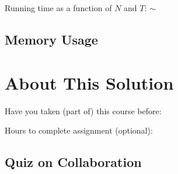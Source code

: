 \documentclass[11pt,a4paper,notitlepage]{article}
\newcommand{\explanation}[1]{}  %
\begin{document}
Running time as a function of $N$ and $T$:  $\sim$ 

\explanation{Explain briefly how you come up this running time}


\subsection{Memory Usage}
\explanation{
How much memory (in bytes) does a \texttt{Percolation} object use to store
an $N$-by-$N$ grid? Use the 64-bit memory cost model from Section 1.4
of the textbook and use tilde notation to simplify your answer.
Briefly justify your answers.}

\explanation{Include the memory for all referenced objects (deep memory).}




\section{About This Solution}

Have you taken (part of) this course before:

Hours to complete assignment (optional):


\subsection{Quiz on Collaboration}
\end{document}
